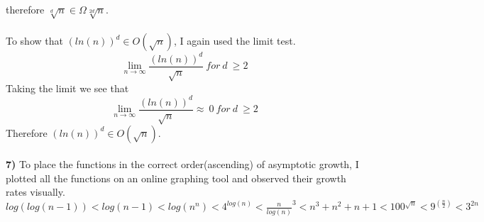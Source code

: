 \documentclass[11pt]{article}
\begin{document}
therefore $\sqrt[d]{n} \in \Omega \sqrt[2d]{n}$.\\ \\
To show that $(ln(n))^d \in O(\sqrt{n})$, I again used the limit test.$$\lim_{n \to \infty}\frac{(ln(n))^d}{\sqrt{n}}\ for\ d\ \geq 2$$ Taking the limit we see that$$\lim_{n \to \infty}\frac{(ln(n))^d}{\sqrt{n}}\approx\ 0\ for\ d\ \geq 2$$ Therefore $(ln(n))^d \in O(\sqrt{n})$.\\ \\
\textbf{7) }To place  the functions in the correct order(ascending) of asymptotic growth, I plotted all the functions on an online graphing tool and observed their growth rates visually.\\

$log(log(n-1)) < log(n-1) < log(n^n) < 4^{log(n)} < \frac{n}{log(n)}^3 < n^3+n^2+n+1 < 100^ {\sqrt{n}} < 9^(\frac{n}{2}) < 3^{2n}$
\end{document}
